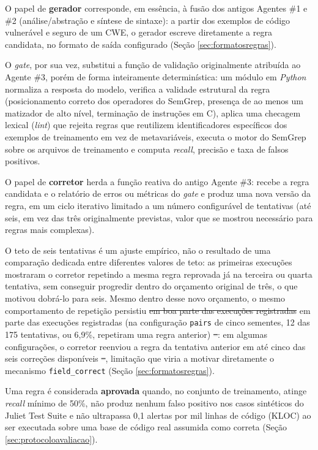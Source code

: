 \documentclass[
    12pt,                %
    openright,           %
    oneside,             %
    a4paper,             %
    english,             %
    brazil               %
]{abntex2}
\newcommand{\antigo}[1]{\sout{#1}}
\newcommand{\novo}[1]{{\color{red}#1}}
\begin{document}
\par
O papel de \textbf{gerador} corresponde, em essência, à fusão dos antigos Agentes \#1 e \#2 (análise/abstração e síntese de sintaxe): a partir dos exemplos de código vulnerável e seguro de um CWE, o gerador escreve diretamente a regra candidata, no formato de saída configurado (Seção \ref{sec:formatosregras}).
\par
O \textit{gate}, por sua vez, substitui a função de validação originalmente atribuída ao Agente \#3, porém de forma inteiramente determinística: um módulo em \textit{Python} normaliza a resposta do modelo, verifica a validade estrutural da regra (posicionamento correto dos operadores do SemGrep, presença de ao menos um matizador de alto nível, terminação de instruções em C), aplica uma checagem lexical (\textit{lint}) que rejeita regras que reutilizem identificadores específicos dos exemplos de treinamento em vez de metavariáveis, executa o motor do SemGrep sobre os arquivos de treinamento e computa \textit{recall}, precisão e taxa de falsos positivos.
\par
O papel de \textbf{corretor} herda a função reativa do antigo Agente \#3: recebe a regra candidata e o relatório de erros ou métricas do \textit{gate} e produz uma nova versão da regra, em um ciclo iterativo limitado a um número configurável de tentativas (até seis, em vez das três originalmente previstas, valor que se mostrou necessário para regras mais complexas).
\par
O teto de seis tentativas é um ajuste empírico, não o resultado de uma comparação dedicada entre diferentes valores de teto: as primeiras execuções mostraram o corretor repetindo a mesma regra reprovada já na terceira ou quarta tentativa, sem conseguir progredir dentro do orçamento original de três, o que motivou dobrá-lo para seis.
Mesmo dentro desse novo orçamento, o mesmo comportamento de repetição persistiu \antigo{em boa parte das execuções registradas} \novo{em parte das execuções registradas (na configuração \texttt{pairs} de cinco sementes, 12 das 175 tentativas, ou 6,9\%, repetiram uma regra anterior)}\antigo{ --}\novo{:} em algumas configurações, o corretor reenviou a regra da tentativa anterior em até cinco das seis correções disponíveis\antigo{ --}, limitação que viria a motivar diretamente o mecanismo \texttt{field\_correct} (Seção \ref{sec:formatosregras}).
\par
Uma regra é considerada \textbf{aprovada} quando, no conjunto de treinamento, atinge \textit{recall} mínimo de 50\%, não produz nenhum falso positivo nos casos sintéticos do Juliet Test Suite e não ultrapassa 0,1 alertas por mil linhas de código (KLOC) ao ser executada sobre uma base de código real assumida como correta (Seção \ref{sec:protocoloavaliacao}).
\end{document}
